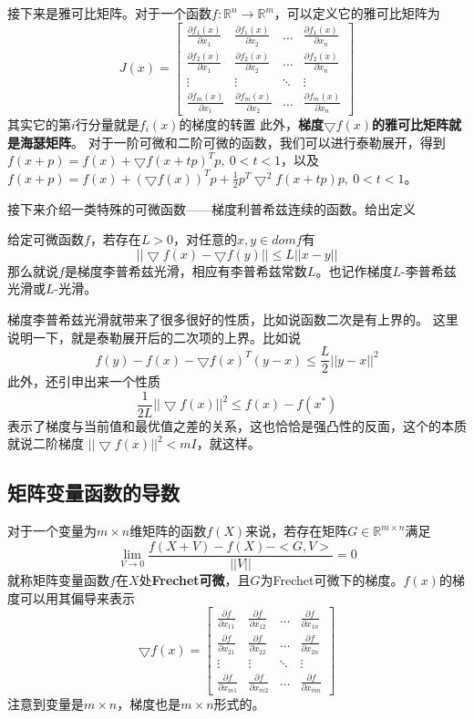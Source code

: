 \documentclass{article}
\begin{document}
接下来是雅可比矩阵。对于一个函数$f:\mathbb{R}^n \rightarrow \mathbb{R}^m$，可以定义它的雅可比矩阵为
$$
J(x)=\left[
    \begin{array}{cccc}
        \frac{\partial f_1(x)}{\partial x_1} & 
        \frac{\partial f_1(x)}{\partial x_2} &
        \dots &
        \frac{\partial f_1(x)}{\partial x_n}\\
        \frac{\partial f_2(x)}{\partial x_1} & 
        \frac{\partial f_2(x)}{\partial x_2} &
        \dots &
        \frac{\partial f_2(x)}{\partial x_n}\\
        \vdots &
        \vdots &
        \ddots &
        \vdots \\
        \frac{\partial f_m(x)}{\partial x_1} & 
        \frac{\partial f_m(x)}{\partial x_2} &
        \dots &
        \frac{\partial f_m(x)}{\partial x_n}
    \end{array}
\right]
$$
其实它的第$i$行分量就是$f_i(x)$的梯度的转置
此外，\textbf{梯度$\bigtriangledown f(x)$的雅可比矩阵就是海瑟矩阵}。
对于一阶可微和二阶可微的函数，我们可以进行泰勒展开，得到$f(x+p)=f(x)+\bigtriangledown f(x+tp)^Tp, \ 0<t<1$，以及$f(x+p)=f(x)+(\bigtriangledown f(x))^Tp+\frac{1}{2}p^T\bigtriangledown ^2 f(x+tp)p, \ 0<t<1$。

接下来介绍一类特殊的可微函数——梯度利普希兹连续的函数。给出定义
\begin{definition}
    给定可微函数$f$，若存在$L>0$，对任意的$x,y \in dom f $有$$||\bigtriangledown f(x)-\bigtriangledown f(y)|| \le L||x-y||$$
    那么就说$f$是梯度李普希兹光滑，相应有李普希兹常数$L$。也记作梯度$L$-李普希兹光滑或$L$-光滑。
\end{definition}
梯度李普希兹光滑就带来了很多很好的性质，比如说函数二次是有上界的。
这里说明一下，就是泰勒展开后的二次项的上界。比如说
$$
    f(y)-f(x)-\bigtriangledown f(x)^T (y-x) \le \frac{L}{2}||y-x||^2
$$
此外，还引申出来一个性质
$$
    \frac{1}{2L}||\bigtriangledown f(x)||^2 \le f(x)-f(x^*)
$$
表示了梯度与当前值和最优值之差的关系，这也恰恰是强凸性的反面，这个的本质就说二阶梯度
$||\bigtriangledown f(x)||^2<mI$，就这样。
\subsection{矩阵变量函数的导数}
对于一个变量为$m \times n$维矩阵的函数$f(X)$来说，若存在矩阵$G \in \mathbb{R}^{m \times n}$满足
$$
\lim\limits_{V \rightarrow 0} \frac{f(X+V)-f(X)-<G,V>}{||V||}=0
$$
就称矩阵变量函数$f$在$X$处\textbf{Frechet可微}，且$G$为Frechet可微下的梯度。$f(x)$的梯度可以用其偏导来表示
$$
\bigtriangledown f(x)=
\left[
\begin{array}{cccc}
    \frac{\partial f}{\partial x_{11}} &
    \frac{\partial f}{\partial x_{12}} &
    \dots &
    \frac{\partial f}{\partial x_{1n}} \\
    \frac{\partial f}{\partial x_{21}} &
    \frac{\partial f}{\partial x_{22}} &
    \dots &
    \frac{\partial f}{\partial x_{2n}} \\
    \vdots &
    \vdots &
    \ddots &
    \vdots \\
    \frac{\partial f}{\partial x_{m1}} &
    \frac{\partial f}{\partial x_{m2}} &
    \dots &
    \frac{\partial f}{\partial x_{mn}} 
\end{array}
\right]
$$
注意到变量是$m \times n$，梯度也是$m \times n$形式的。
\end{document}
